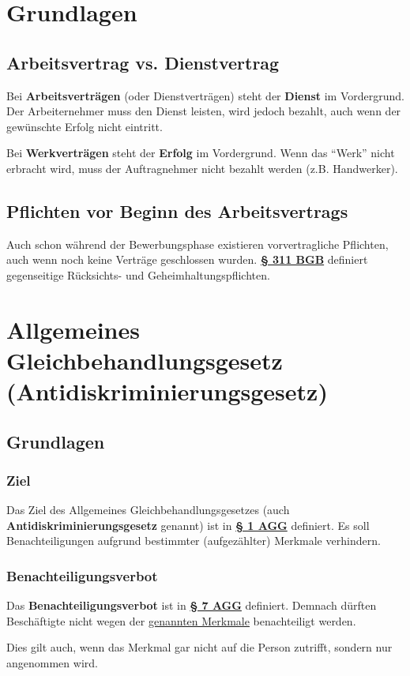\documentclass[12pt,A4]{extarticle}
\newcommand{\highlight}[1]{\textcolor{highlightColor}{\textbf{#1}}}
\newcommand{\bgb}[2][]{\textbf{\textcolor{gesetzLink}{\href{https://www.gesetze-im-internet.de/bgb/__#2.html}{§ #2 \ifthenelse{\equal{#1}{}}{}{#1 }BGB}}}}
\newcommand{\agG}[2][]{\textbf{\textcolor{gesetzLink}{\href{https://www.gesetze-im-internet.de/agg/__#2.html}{§ #2 \ifthenelse{\equal{#1}{}}{}{#1 }AGG}}}}
\begin{document}
\disclaimer

\tableofcontents
\clearpage

\section{Grundlagen}
\subsection{Arbeitsvertrag vs. Dienstvertrag}
Bei \textbf{Arbeitsverträgen} (oder Dienstverträgen) steht der \textbf{Dienst} im Vordergrund. Der Arbeiternehmer muss den Dienst leisten, wird jedoch bezahlt, auch wenn der gewünschte Erfolg nicht eintritt.\par
Bei \textbf{Werkverträgen} steht der \textbf{Erfolg} im Vordergrund. Wenn das ``Werk'' nicht erbracht wird, muss der Auftragnehmer nicht bezahlt werden (z.B. Handwerker).

\subsection{Pflichten vor Beginn des Arbeitsvertrags}
Auch schon während der Bewerbungsphase existieren vorvertragliche Pflichten, auch wenn noch keine Verträge geschlossen wurden. \bgb[Abs. 2]{311} definiert gegenseitige Rücksichts- und Geheimhaltungspflichten.

\section{Allgemeines Gleichbehandlungsgesetz (Antidiskriminierungsgesetz)}
\subsection{Grundlagen}
\subsubsection{Ziel}\label{sec:aggZiel}
Das Ziel des Allgemeines Gleichbehandlungsgesetzes (auch \highlight{Antidiskriminierungsgesetz} genannt) ist in \agG{1} definiert. Es soll Benachteiligungen aufgrund bestimmter (aufgezählter) Merkmale verhindern.

\subsubsection{Benachteiligungsverbot}
Das \textbf{Benachteiligungsverbot} ist in \agG{7} definiert. Demnach dürften Beschäftigte nicht wegen der \hyperref[sec:aggZiel]{genannten Merkmale} benachteiligt werden.\par
Dies gilt auch, wenn das Merkmal gar nicht auf die Person zutrifft, sondern nur angenommen wird.
\end{document}
